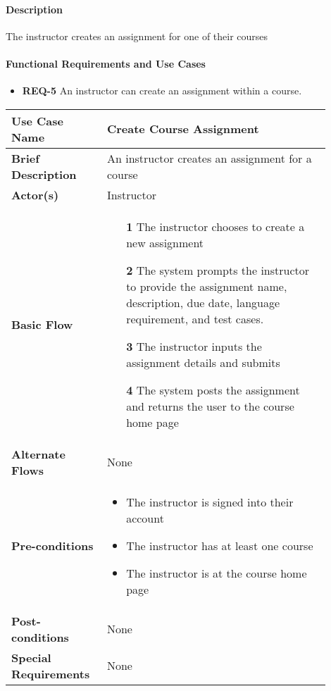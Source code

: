 \documentclass{article}
\begin{document}
\paragraph{Description} The instructor creates an assignment for one of their courses

\paragraph{Functional Requirements and Use Cases}
\begin{itemize}
  \item \textbf{REQ-5} An instructor can create an assignment within a course.
\end{itemize}

\vspace{0.1in}

\begin{tabular}{| p{0.25\linewidth} | p{0.65\linewidth} |}
  \hline
  \textbf{Use Case Name} & Create Course Assignment \\
  \hline
  \textbf{Brief Description} & An instructor creates an assignment for a course  \\
  \hline
  \textbf{Actor(s)} & Instructor \\
  \hline
  \textbf{Basic Flow} & \begin{itemize}
    \item[\textbf{1}] The instructor chooses to create a new assignment
    \item[\textbf{2}] The system prompts the instructor to provide the assignment name, description, due date, language requirement, and test cases.
    \item[\textbf{3}] The instructor inputs the assignment details and submits
    \item[\textbf{4}] The system posts the assignment and returns the user to the course home page
  \end{itemize}\\
  \hline
  \textbf{Alternate Flows} & None \\
  \hline
  \textbf{Pre-conditions} & \begin{itemize}
    \item The instructor is signed into their account
    \item The instructor has at least one course
    \item The instructor is at the course home page
  \end{itemize} \\
  \hline
  \textbf{Post-conditions} & None \\
  \hline
  \textbf{Special Requirements} & None \\
  \hline
\end{tabular}
\end{document}
